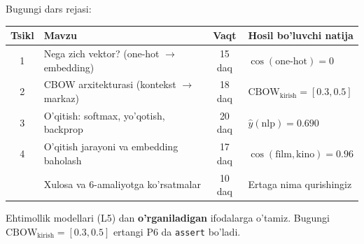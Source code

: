 \documentclass[aspectratio=169,11pt]{beamer}
\begin{document}
\begin{frame}{Bugungi dars rejasi:}
  \begin{center}
  \small
  \begin{tabular}{c p{5.0cm} c p{3.2cm}}
    \toprule
    \textbf{Tsikl}& \textbf{Mavzu} & \textbf{Vaqt} & \textbf{Hosil bo'luvchi natija}\\
    \midrule
    1 & Nega zich vektor? (one-hot $\to$ embedding) & 15 daq & $\cos(\text{one-hot})=0$ \\
    2 & CBOW arxitekturasi (kontekst $\to$ markaz) & 18 daq & $\text{CBOW}_{\text{kirish}}=[0.3,0.5]$ \\
    3 & O'qitish: softmax, yo'qotish, backprop & 20 daq & $\hat{y}(\text{nlp})=0.690$ \\
    4 & O'qitish jarayoni va embedding baholash & 17 daq & $\cos(\text{film},\text{kino})=0.96$ \\
    \midrule
      & Xulosa va 6-amaliyotga ko'rsatmalar & 10 daq & Ertaga nima qurishingiz \\
    \bottomrule
  \end{tabular}
  \end{center}
  \vspace{4pt}
  \begin{tcolorbox}[warnbox,title=Bu dars 2-haftani davom ettiradi]
    \footnotesize\sloppy
    Ehtimollik modellari (L5) dan \textbf{o'rganiladigan} ifodalarga o'tamiz.
    Bugungi $\text{CBOW}_{\text{kirish}}=[0.3,0.5]$ ertangi P6 da \texttt{assert} bo'ladi.
  \end{tcolorbox}
\end{frame}
\end{document}
